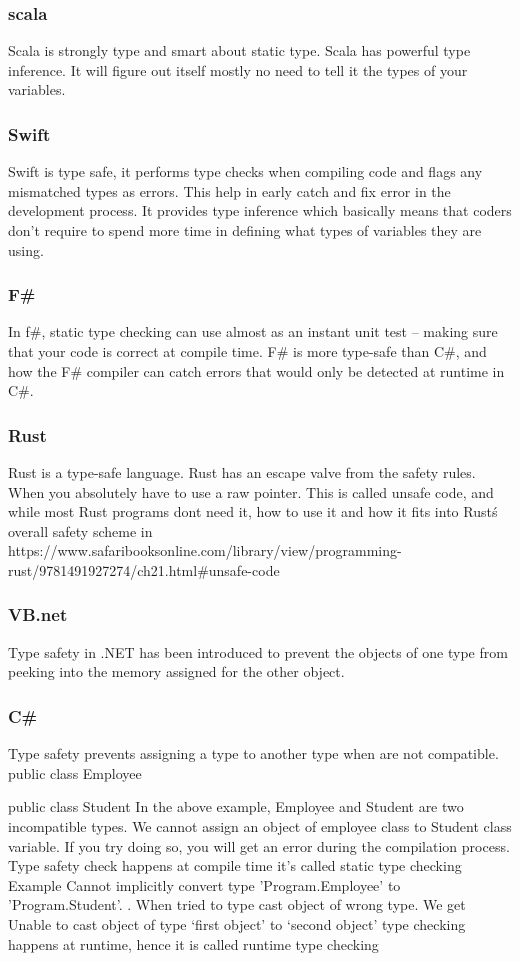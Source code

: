 \documentclass{sig-alternate}
\begin{document}
\subsubsection{scala}
Scala is strongly type and smart about static type. Scala has powerful type inference. It will figure out itself mostly no need to tell it the types of your variables. 
\subsubsection{Swift}
Swift is type safe, it performs type checks when compiling code and flags any mismatched types as errors. This help in early catch and fix error in the development process. 
It provides type inference which basically means that coders don’t require to spend more time in defining what types of variables they are using.
\subsubsection{F\#}
In f\#, static type checking can use almost as an instant unit test – making sure that your code is correct at compile time.
F\# is more type-safe than C\#, and how the F\# compiler can catch errors that would only be detected at runtime in C\#.
\subsubsection{Rust }
Rust is a type-safe language. Rust has an escape valve from the safety rules. When you absolutely have to use a raw pointer. This is called unsafe code, and while most Rust programs dont need it, 
how to use it and how it fits into Rust\'s overall safety scheme in
 \\ https://www.safaribooksonline.com/library/view/programming-rust/9781491927274/ch21.html\#unsafe-code

\subsubsection{VB.net}
Type safety in .NET has been introduced to prevent the objects of one type from peeking into the memory assigned for the other object.
\subsubsection{C\#}
Type safety prevents assigning a type to another type when are not compatible.
public class Employee{}

public class Student{}
In the above example, Employee and Student are two incompatible types. We cannot assign an object of employee class to Student class variable. If you try doing so, you will get an error during the compilation process. Type safety check happens at compile time it's called static type checking
Example
Cannot implicitly convert type 'Program.Employee' to 'Program.Student'.
. When tried to type cast object of wrong type. We get 
Unable to cast object of type ‘first object’ to ‘second object’
type checking happens at runtime, hence it is called runtime type checking
\end{document}
